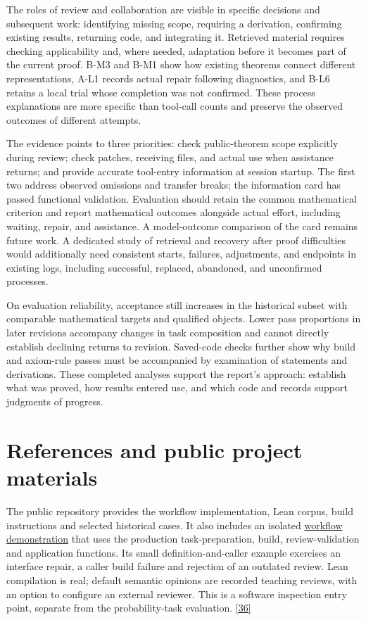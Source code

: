 The roles of review and collaboration are visible in specific decisions and subsequent work: identifying missing scope, requiring a derivation, confirming existing results, returning code, and integrating it. Retrieved material requires checking applicability and, where needed, adaptation before it becomes part of the current proof. B-M3 and B-M1 show how existing theorems connect different representations, A-L1 records actual repair following diagnostics, and B-L6 retains a local trial whose completion was not confirmed. These process explanations are more specific than tool-call counts and preserve the observed outcomes of different attempts.

The evidence points to three priorities: check public-theorem scope explicitly during review; check patches, receiving files, and actual use when assistance returns; and provide accurate tool-entry information at session startup. The first two address observed omissions and transfer breaks; the information card has passed functional validation. Evaluation should retain the common mathematical criterion and report mathematical outcomes alongside actual effort, including waiting, repair, and assistance. A model-outcome comparison of the card remains future work. A dedicated study of retrieval and recovery after proof difficulties would additionally need consistent starts, failures, adjustments, and endpoints in existing logs, including successful, replaced, abandoned, and unconfirmed processes.

On evaluation reliability, acceptance still increases in the historical subset with comparable mathematical targets and qualified objects. Lower pass proportions in later revisions accompany changes in task composition and cannot directly establish declining returns to revision. Saved-code checks further show why build and axiom-rule passes must be accompanied by examination of statements and derivations. These completed analyses support the report's approach: establish what was proved, how results entered use, and which code and records support judgments of progress.

\section[References and public project materials]{\texorpdfstring{\protect\hypertarget{section-7}{}References and public project materials}{References and public project materials}}
The public repository provides the workflow implementation, Lean corpus, build instructions and selected historical cases. It also includes an isolated \href{https://github.com/Kind-NK-Hill/ProbabilityTheoryFormalization/blob/d07f272850899b58612adf1c7dc202538503252f/docs/workflow_demo.md}{workflow demonstration} that uses the production task-preparation, build, review-validation and application functions. Its small definition-and-caller example exercises an interface repair, a caller build failure and rejection of an outdated review. Lean compilation is real; default semantic opinions are recorded teaching reviews, with an option to configure an external reviewer. This is a software inspection entry point, separate from the probability-task evaluation. \hyperlink{ref-36}{\mbox{[36]}}

